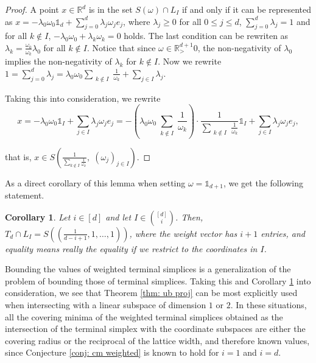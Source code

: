 \documentclass{amsart}
\newtheorem{corollary}[theorem]{Corollary}
\theoremstyle{definition}
\theoremstyle{remark}
\newcommand{\R}{\mathbb{R}}
\begin{document}
\begin{proof}
A point $x\in \R^d$ is in the set $S(\omega)\cap L_I$ if and only if it can be represented as $x=-\lambda_0\omega_0\mathbb{1}_d+\sum\limits_{j=0}^d \lambda_j\omega_je_j$, where $\lambda_j\geq 0$ for all $0\leqslant j \leqslant d$, $\sum\limits_{j=0}^d\lambda_j=1$ and for all $k\notin I$,  $-\lambda_0\omega_0+\lambda_k\omega_k=0$ holds. The last condition can be rewriten as $\lambda_k=\frac{\omega_0}{\omega_k}\lambda_0$ for all $k\notin I$. Notice that since $\omega\in \R^{d+1}_>0$, the non-negativity of $\lambda_0$ implies the non-negativity of $\lambda_k$ for $k\notin I$. Now we rewrite $1=\sum\limits_{j=0}^d\lambda_j=\lambda_0\omega_0\sum\limits_{\substack{k \notin I}}\frac{1}{\omega_k}+\sum\limits_{j\in I}\lambda_j$.

Taking this into consideration, we rewrite 
$$x=-\lambda_0\omega_0\mathbb{1}_I+\sum\limits_{j\in I}\lambda_j\omega_je_j =-\left(\lambda_0\omega_0\sum\limits_{\substack{ k \notin I}}\frac{1}{\omega_k}\right)\cdot \frac{1}{\sum\limits_{\substack{ k \notin I}} \frac{1}{\omega_k}}\mathbb{1}_I+\sum\limits_{j\in I}\lambda_j\omega_je_j,$$

that is, $x\in S\left(
\frac{1}{\sum\limits_{ k \notin I} \frac{1}{\omega_k}},\;
(\omega_j)_{j\in I}
\right)$.

\end{proof}

As a direct corollary of this lemma when setting $\omega=\mathbb{1}_{d+1}$, we get the following statement.

\begin{corollary} \label{lem: terminal simplex intersected with coordinate subspace}
Let $i\in [d]$ and let $I\in {[d]\choose i}$. Then, $T_d\cap L_I=S((\frac{1}{d-i+1}, 1, \dots, 1))$, where the weight vector has $i+1$ entries, and equality means really the equality if we restrict to the coordinates in $I$.
\end{corollary}

Bounding the values of weighted terminal simplices is a generalization of the problem of bounding those of terminal simplices. Taking this and Corollary \ref{lem: terminal simplex intersected with coordinate subspace} into consideration, we see that Theorem  \ref{thm: ub proj} can be most explicitly used when intersecting with a linear subspace of dimension $1$ or $2$. In these situations, all the covering minima of the weighted terminal simplices obtained as the intersection of the terminal simplex with the coordinate subspaces are either the covering radius or the reciprocal of the lattice width, and therefore known values, since Conjecture \ref{conj: cm weighted} is known to hold for $i=1$ and $i=d$. 
\end{document}
